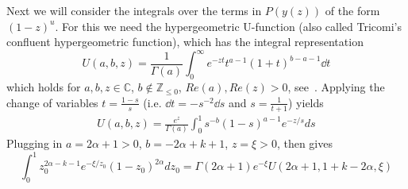 Next we will consider the integrals over the terms in $P(y(z))$ of the form $(1-z)^u$. For this we need the 
hypergeometric U-function (also called Tricomi's confluent hypergeometric function), which has the integral representation 
\[
	U(a,b,z) = \frac{1}{\Gamma(a)} \int_0^\infty e^{-zt} t^{a-1} (1+t)^{b-a-1} \dd t
\] 
which holds for $a,b,z\in \mathbb{C}$, $b \not \in \mathbb{Z}_{\leq 0}$, $Re(a), Re(z) >0$, see~\cite[p.255]{erdelyi1953higher}. 
Applying the change of variables $t=\frac{1-s}{s}$ (i.e. $\dd t = -s^{-2} \dd s$ and $s = \frac{1}{t+1}$) yields
\begin{align*}
	U(a,b,z) = \frac{e^z}{\Gamma(a)} \int_0^1 s^{-b} (1-s)^{a-1} e^{-z/s} ds
\end{align*}
Plugging in $a=2\alpha+1 >0$, $b=-2\alpha+k+1$, $z=\xi>0$, then gives
\begin{equation}\label{eq:integral_Delta_P_1_z}
	\int_0^1 z_0^{2\alpha-k-1} e^{-\xi/z_0} (1-z_0)^{2\alpha} dz_0 = \Gamma(2\alpha+1)e^{-\xi} U(2\alpha+1,1+k-2\alpha,\xi)
\end{equation}

